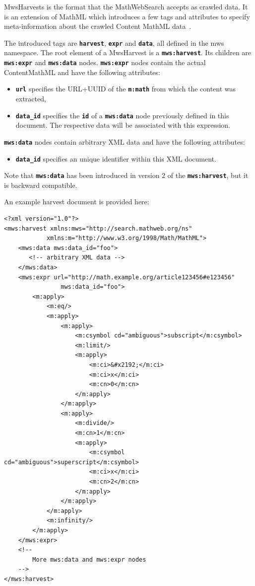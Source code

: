 \documentclass{deliverablereport}
\def\MWS{\textsf{MathWebSearch}\xspace}
\begin{document}
MwsHarvests is the format that the \MWS accepts as crawled data. It is an
extension of MathML which introduces a few tags and attributes to specify meta-information
about the crawled Content MathML data~\cite{MWSH}.

The introduced tags are \textbf{\texttt{harvest}}, \textbf{\texttt{expr}} and
\textbf{\texttt{data}}, all defined in the mws namespace. The root element of a MwsHarvest
is a \textbf{\texttt{mws:harvest}}. Its children are \textbf{\texttt{mws:expr}} and
\textbf{\texttt{mws:data}} nodes. \textbf{\texttt{mws:expr}} nodes contain the actual
ContentMathML and have the following attributes:

\begin{itemize}
\item \textbf{\texttt{url}} specifies the URL+UUID of the \textbf{\texttt{m:math}} from
  which the content was extracted,
\item \textbf{\texttt{data\_id}} specifies the \textbf{\texttt{id}} of a
  \textbf{\texttt{mws:data}} node previously defined in this document. The respective data
  will be associated with this expression.
\end{itemize}

\textbf{\texttt{mws:data}} nodes contain arbitrary XML data and have the following
attributes:
\begin{itemize}
\item \textbf{\texttt{data\_id}} specifies an unique identifier within this XML document.
\end{itemize}

Note that \textbf{\texttt{mws:data}} has been introduced in version 2 of the
\textbf{\texttt{mws:harvest}}, but it is backward compatible.

An example harvest document is provided here:

\lstset{language=XML,basicstyle=\footnotesize\sf}
\begin{lstlisting}
<?xml version="1.0"?>
<mws:harvest xmlns:mws="http://search.mathweb.org/ns" 
			xmlns:m="http://www.w3.org/1998/Math/MathML">
    <mws:data mws:data_id="foo">
       <!-- arbitrary XML data -->
    </mws:data>
    <mws:expr url="http://math.example.org/article123456#e123456"
    			mws:data_id="foo">
        <m:apply>
            <m:eq/>
            <m:apply>
                <m:apply>
                    <m:csymbol cd="ambiguous">subscript</m:csymbol>
                    <m:limit/>
                    <m:apply>
                        <m:ci>&#x2192;</m:ci>
                        <m:ci>x</m:ci>
                        <m:cn>0</m:cn>
                    </m:apply>
                </m:apply>
                <m:apply>
                    <m:divide/>
                    <m:cn>1</m:cn>
                    <m:apply>
                        <m:csymbol cd="ambiguous">superscript</m:csymbol>
                        <m:ci>x</m:ci>
                        <m:cn>2</m:cn>
                    </m:apply>
                </m:apply>
            </m:apply>
            <m:infinity/>
        </m:apply>
    </mws:expr>
    <!--
        More mws:data and mws:expr nodes
    -->
</mws:harvest>
\end{lstlisting}
\end{document}
